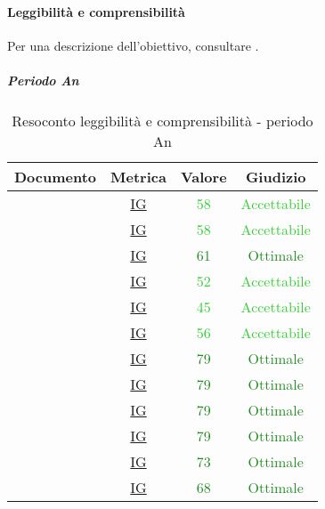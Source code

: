 					\paragraph{Leggibilità e comprensibilità}
						Per una descrizione dell'obiettivo, consultare .
						\subparagraph{Periodo An}
							\begin{table}[H]
								\centering
								\small
								\begin{tabular}{c | c | c | c}
									\hline
									\textbf{Documento} & \textbf{Metrica}    & \textbf{Valore} & \textbf{Giudizio} \\ \hline
									      \pdpvuno        & \hyperref[MLEC]{IG} &  \textcolor{LimeGreen}{58}              & \textcolor{LimeGreen}{Accettabile} \\
									      \pdqvuno        & \hyperref[MLEC]{IG} &  \textcolor{LimeGreen}{58}               &  \textcolor{LimeGreen}{Accettabile} \\
									      \ndpvuno        & \hyperref[MLEC]{IG} &  \textcolor{ForestGreen}{61}               & \textcolor{ForestGreen}{Ottimale}\\
									      \sdfv        & \hyperref[MLEC]{IG} &  \textcolor{LimeGreen}{52}               &  \textcolor{LimeGreen}{Accettabile}\\
									      \adrvuno        & \hyperref[MLEC]{IG} &  \textcolor{LimeGreen}{45}               &  \textcolor{LimeGreen}{Accettabile}\\
									       \glvuno        & \hyperref[MLEC]{IG} &  \textcolor{LimeGreen}{56}               & \textcolor{LimeGreen}{Accettabile} \\
									      \vunoi       & \hyperref[MLEC]{IG} &  \textcolor{ForestGreen}{79}               & \textcolor{ForestGreen}{Ottimale}\\
									      \vduei       & \hyperref[MLEC]{IG} &  \textcolor{ForestGreen}{79}               & \textcolor{ForestGreen}{Ottimale}\\
									      \vtrei       & \hyperref[MLEC]{IG} &  \textcolor{ForestGreen}{79}               & \textcolor{ForestGreen}{Ottimale}\\
									    \vquattroi     & \hyperref[MLEC]{IG} &  \textcolor{ForestGreen}{79}               & \textcolor{ForestGreen}{Ottimale}\\
									      \vunoe       & \hyperref[MLEC]{IG} &   \textcolor{ForestGreen}{73}              & \textcolor{ForestGreen}{Ottimale}\\
									      \vduee       & \hyperref[MLEC]{IG} &   \textcolor{ForestGreen}{68}              & \textcolor{ForestGreen}{Ottimale}\\ \hline
								\end{tabular}
								\caption{Resoconto leggibilità e comprensibilità - periodo An}
								\label{tab_resoconto_leggibilità_e_comprensibilità_PA}
							\end{table}
			
